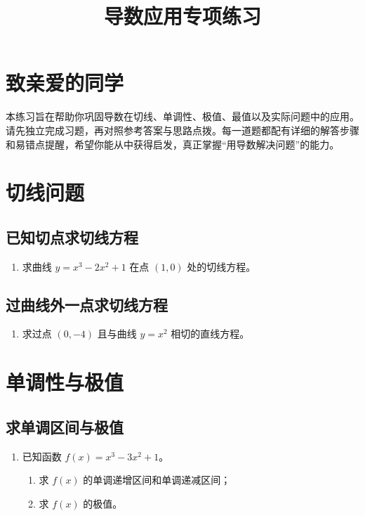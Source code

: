 \documentclass[10pt]{article}
\title{导数应用专项练习}
\author{}
\date{}
\begin{document}
\maketitle

\section*{致亲爱的同学}
本练习旨在帮助你巩固导数在切线、单调性、极值、最值以及实际问题中的应用。请先独立完成习题，再对照参考答案与思路点拨。每一道题都配有详细的解答步骤和易错点提醒，希望你能从中获得启发，真正掌握“用导数解决问题”的能力。

\section{切线问题}
\subsection{已知切点求切线方程}
\begin{enumerate}[label=\arabic*.]
    \item 求曲线 $y = x^3 - 2x^2 + 1$ 在点 $(1, 0)$ 处的切线方程。
\end{enumerate}

\subsection{过曲线外一点求切线方程}
\begin{enumerate}[label=\arabic*., resume]
    \item 求过点 $(0, -4)$ 且与曲线 $y = x^2$ 相切的直线方程。
\end{enumerate}

\section{单调性与极值}
\subsection{求单调区间与极值}
\begin{enumerate}[label=\arabic*., resume]
    \item 已知函数 $f(x) = x^3 - 3x^2 + 1$。
    \begin{enumerate}
        \item 求 $f(x)$ 的单调递增区间和单调递减区间；
        \item 求 $f(x)$ 的极值。
    \end{enumerate}
\end{enumerate}
\end{document}
